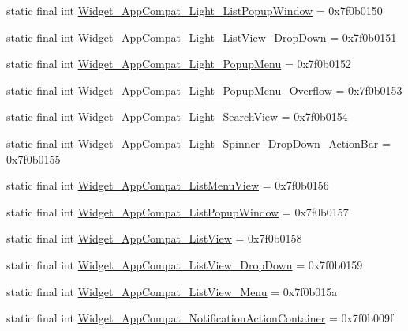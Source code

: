 \begin{CompactItemize}
\item 
static final int \hyperlink{classandroid_1_1support_1_1graphics_1_1drawable_1_1_r_1_1style_fa76dfb99582dc1201303ad5c8129672}{Widget\_\-AppCompat\_\-Light\_\-ListPopupWindow} = 0x7f0b0150
\item 
static final int \hyperlink{classandroid_1_1support_1_1graphics_1_1drawable_1_1_r_1_1style_d3618aa1fa7474436b3a7c9cf13905f4}{Widget\_\-AppCompat\_\-Light\_\-ListView\_\-DropDown} = 0x7f0b0151
\item 
static final int \hyperlink{classandroid_1_1support_1_1graphics_1_1drawable_1_1_r_1_1style_fb68338db92b2b349b77d7e441ef868a}{Widget\_\-AppCompat\_\-Light\_\-PopupMenu} = 0x7f0b0152
\item 
static final int \hyperlink{classandroid_1_1support_1_1graphics_1_1drawable_1_1_r_1_1style_8411277721b275d9ede598fc9b40093c}{Widget\_\-AppCompat\_\-Light\_\-PopupMenu\_\-Overflow} = 0x7f0b0153
\item 
static final int \hyperlink{classandroid_1_1support_1_1graphics_1_1drawable_1_1_r_1_1style_470b387eb2e6978b8be75678bca077de}{Widget\_\-AppCompat\_\-Light\_\-SearchView} = 0x7f0b0154
\item 
static final int \hyperlink{classandroid_1_1support_1_1graphics_1_1drawable_1_1_r_1_1style_98af56c065b2397f5d2ced6a50da8972}{Widget\_\-AppCompat\_\-Light\_\-Spinner\_\-DropDown\_\-ActionBar} = 0x7f0b0155
\item 
static final int \hyperlink{classandroid_1_1support_1_1graphics_1_1drawable_1_1_r_1_1style_ced1451fe4c7adc2394c90767b6b27b5}{Widget\_\-AppCompat\_\-ListMenuView} = 0x7f0b0156
\item 
static final int \hyperlink{classandroid_1_1support_1_1graphics_1_1drawable_1_1_r_1_1style_ef5dc5aac94c3b30ae68503efe075fbc}{Widget\_\-AppCompat\_\-ListPopupWindow} = 0x7f0b0157
\item 
static final int \hyperlink{classandroid_1_1support_1_1graphics_1_1drawable_1_1_r_1_1style_f427afd1277568bc4563900ef6dad3cc}{Widget\_\-AppCompat\_\-ListView} = 0x7f0b0158
\item 
static final int \hyperlink{classandroid_1_1support_1_1graphics_1_1drawable_1_1_r_1_1style_351cf4246e1c84b1661f1028118e63fc}{Widget\_\-AppCompat\_\-ListView\_\-DropDown} = 0x7f0b0159
\item 
static final int \hyperlink{classandroid_1_1support_1_1graphics_1_1drawable_1_1_r_1_1style_9dbdbcd2c4e7afe77d5fe7cb45dfab1b}{Widget\_\-AppCompat\_\-ListView\_\-Menu} = 0x7f0b015a
\item 
static final int \hyperlink{classandroid_1_1support_1_1graphics_1_1drawable_1_1_r_1_1style_1e55e5d5e71d2006aca3bace794e5fa4}{Widget\_\-AppCompat\_\-NotificationActionContainer} = 0x7f0b009f

\end{CompactItemize}
